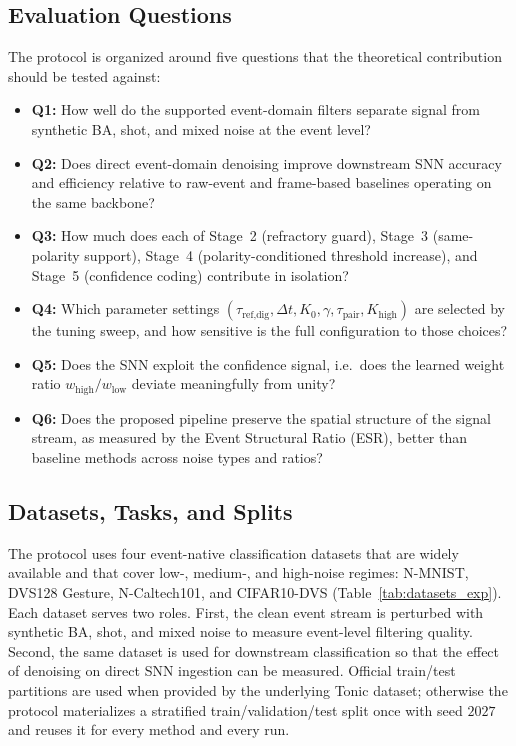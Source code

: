 \documentclass[a4paper,fleqn]{cas-dc}
\begin{document}
\subsection{Evaluation Questions}

The protocol is organized around five questions that the theoretical contribution should be tested against:
\begin{itemize}
    \item \textbf{Q1:} How well do the supported event-domain filters separate signal from synthetic BA, shot, and mixed noise at the event level?
    \item \textbf{Q2:} Does direct event-domain denoising improve downstream SNN accuracy and efficiency relative to raw-event and frame-based baselines operating on the same backbone?
    \item \textbf{Q3:} How much does each of Stage~2 (refractory guard), Stage~3 (same-polarity support), Stage~4 (polarity-conditioned threshold increase), and Stage~5 (confidence coding) contribute in isolation?
    \item \textbf{Q4:} Which parameter settings $(\tau_{\text{ref,dig}}, \Delta t, K_0, \gamma, \tau_{\text{pair}}, K_{\text{high}})$ are selected by the tuning sweep, and how sensitive is the full configuration to those choices?
    \item \textbf{Q5:} Does the SNN exploit the confidence signal, i.e.\ does the learned weight ratio $w_{\text{high}}/w_{\text{low}}$ deviate meaningfully from unity?
    \item \textbf{Q6:} Does the proposed pipeline preserve the spatial structure of the signal stream, as measured by the Event Structural Ratio (ESR), better than baseline methods across noise types and ratios?
\end{itemize}

\subsection{Datasets, Tasks, and Splits}

The protocol uses four event-native classification datasets that are widely available and that cover low-, medium-, and high-noise regimes: N-MNIST, DVS128 Gesture, N-Caltech101, and CIFAR10-DVS (Table~\ref{tab:datasets_exp}). Each dataset serves two roles. First, the clean event stream is perturbed with synthetic BA, shot, and mixed noise to measure event-level filtering quality. Second, the same dataset is used for downstream classification so that the effect of denoising on direct SNN ingestion can be measured. Official train/test partitions are used when provided by the underlying Tonic dataset; otherwise the protocol materializes a stratified train/validation/test split once with seed $2027$ and reuses it for every method and every run.
\end{document}
